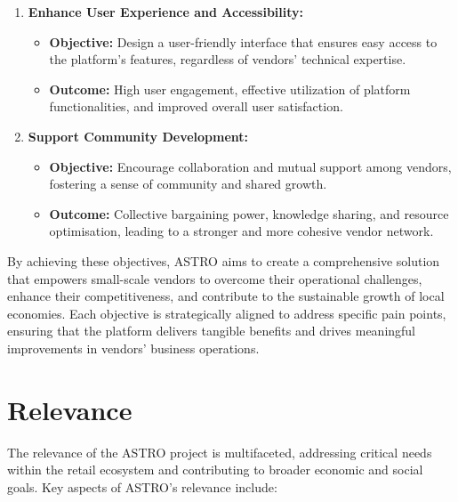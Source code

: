 \begin{enumerate}
	\item \textbf{Enhance User Experience and Accessibility:}
	      \begin{itemize}
		      \item \textbf{Objective:} Design a user-friendly interface that ensures easy access to the platform’s features, regardless of vendors’ technical expertise.
		      \item \textbf{Outcome:} High user engagement, effective utilization of platform functionalities, and improved overall user satisfaction.
	      \end{itemize}

	\item \textbf{Support Community Development:}
	      \begin{itemize}
		      \item \textbf{Objective:} Encourage collaboration and mutual support among vendors, fostering a sense of community and shared growth.
		      \item \textbf{Outcome:} Collective bargaining power, knowledge sharing, and resource optimisation, leading to a stronger and more cohesive vendor network.
	      \end{itemize}
\end{enumerate}

By achieving these objectives, ASTRO aims to create a comprehensive solution that empowers small-scale vendors to overcome their operational challenges, enhance their competitiveness, and contribute to the sustainable growth of local economies. Each objective is strategically aligned to address specific pain points, ensuring that the platform delivers tangible benefits and drives meaningful improvements in vendors' business operations.




\section{Relevance}

The relevance of the ASTRO project is multifaceted, addressing critical needs within the retail ecosystem and contributing to broader economic and social goals. Key aspects of ASTRO’s relevance include:

